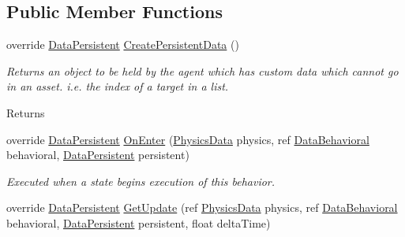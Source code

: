 \subsection*{Public Member Functions}
\begin{DoxyCompactItemize}
\item 
\hypertarget{class_skyrates_1_1_a_i_1_1_decorator_1_1_smooth_target_a8953e0395b1f115449335af08241e9e1}{override \hyperlink{class_skyrates_1_1_a_i_1_1_behavior_1_1_data_persistent}{Data\-Persistent} \hyperlink{class_skyrates_1_1_a_i_1_1_decorator_1_1_smooth_target_a8953e0395b1f115449335af08241e9e1}{Create\-Persistent\-Data} ()}\label{class_skyrates_1_1_a_i_1_1_decorator_1_1_smooth_target_a8953e0395b1f115449335af08241e9e1}

\begin{DoxyCompactList}\small\item\em Returns an object to be held by the agent which has custom data which cannot go in an asset. i.\-e. the index of a target in a list. 

\begin{DoxyReturn}{Returns}

\end{DoxyReturn}
 \end{DoxyCompactList}\item 
override \hyperlink{class_skyrates_1_1_a_i_1_1_behavior_1_1_data_persistent}{Data\-Persistent} \hyperlink{class_skyrates_1_1_a_i_1_1_decorator_1_1_smooth_target_a1a29e072563bc8a2e30c390e97a8062f}{On\-Enter} (\hyperlink{class_skyrates_1_1_physics_1_1_physics_data}{Physics\-Data} physics, ref \hyperlink{class_skyrates_1_1_a_i_1_1_behavior_1_1_data_behavioral}{Data\-Behavioral} behavioral, \hyperlink{class_skyrates_1_1_a_i_1_1_behavior_1_1_data_persistent}{Data\-Persistent} persistent)
\begin{DoxyCompactList}\small\item\em Executed when a state begins execution of this behavior. \end{DoxyCompactList}\item 
\hypertarget{class_skyrates_1_1_a_i_1_1_decorator_1_1_smooth_target_a38b2823d479254250b30bf46909f23d5}{override \hyperlink{class_skyrates_1_1_a_i_1_1_behavior_1_1_data_persistent}{Data\-Persistent} \hyperlink{class_skyrates_1_1_a_i_1_1_decorator_1_1_smooth_target_a38b2823d479254250b30bf46909f23d5}{Get\-Update} (ref \hyperlink{class_skyrates_1_1_physics_1_1_physics_data}{Physics\-Data} physics, ref \hyperlink{class_skyrates_1_1_a_i_1_1_behavior_1_1_data_behavioral}{Data\-Behavioral} behavioral, \hyperlink{class_skyrates_1_1_a_i_1_1_behavior_1_1_data_persistent}{Data\-Persistent} persistent, float delta\-Time)}\label{class_skyrates_1_1_a_i_1_1_decorator_1_1_smooth_target_a38b2823d479254250b30bf46909f23d5}


\end{DoxyCompactItemize}
